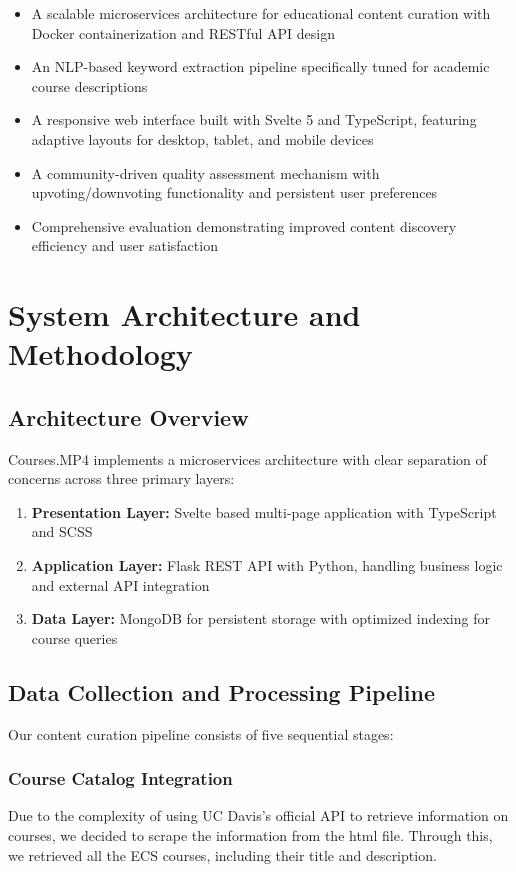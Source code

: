 \documentclass[manuscript,nonacm]{acmart}
\begin{document}
\begin{itemize}
    \item A scalable microservices architecture for educational content curation with Docker containerization and RESTful API design
    \item An NLP-based keyword extraction pipeline specifically tuned for academic course descriptions
    \item A responsive web interface built with Svelte 5 and TypeScript, featuring adaptive layouts for desktop, tablet, and mobile devices
    \item A community-driven quality assessment mechanism with upvoting/downvoting functionality and persistent user preferences
    \item Comprehensive evaluation demonstrating improved content discovery efficiency and user satisfaction
\end{itemize}

\section{System Architecture and Methodology}

\subsection{Architecture Overview}

Courses.MP4 implements a microservices architecture with clear separation of concerns across three primary layers:

\begin{enumerate}
    \item \textbf{Presentation Layer:} Svelte based multi-page application with TypeScript and SCSS
    \item \textbf{Application Layer:} Flask REST API with Python, handling business logic and external API integration
    \item \textbf{Data Layer:} MongoDB for persistent storage with optimized indexing for course queries
\end{enumerate}

\subsection{Data Collection and Processing Pipeline}

Our content curation pipeline consists of five sequential stages:

\subsubsection{Course Catalog Integration}
Due to the complexity of using UC Davis's official API to retrieve information on courses, we decided to scrape the information from the html file. Through this, we retrieved all the ECS courses, including their title and description.
\end{document}

